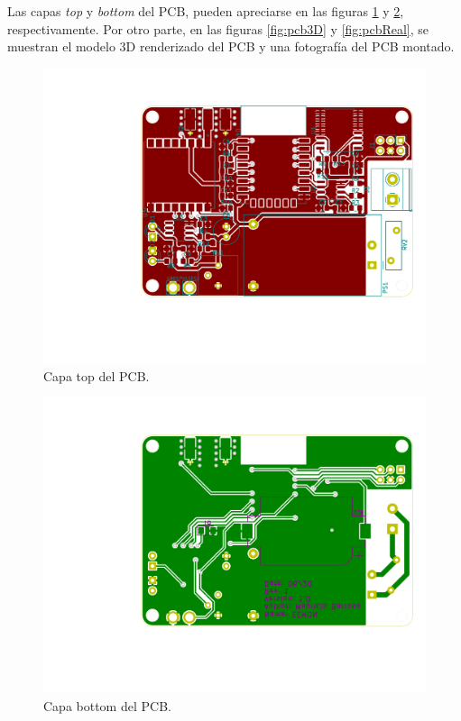 Las capas \textit{top} y \textit{bottom} del PCB, pueden apreciarse en las figuras \ref{fig:pcbTop} y \ref{fig:pcbBot}, respectivamente. Por otro parte, en las figuras \ref{fig:pcb3D} y \ref{fig:pcbReal}, se muestran el modelo 3D renderizado del PCB y una fotografía del PCB montado.

\begin{figure}[h]
	\centering
	\includegraphics[scale=0.5]{./Figures/pcb_top.pdf}
	\caption{Capa top del PCB.}
		\label{fig:pcbTop}
\end{figure}

\begin{figure}[h]
	\centering
	\includegraphics[scale=0.5]{./Figures/pcb_bot.pdf}
	\caption{Capa bottom del PCB.}
		\label{fig:pcbBot}
\end{figure}

